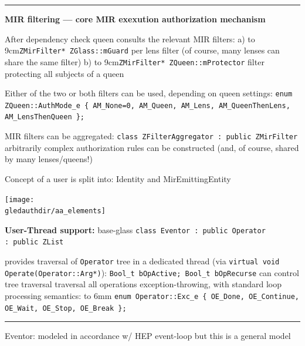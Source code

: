 \documentclass[12pt]{article}
\def\nl{\newline}
\def\bl{\bigskip\hrule\bigskip}
\def\hs6{\hbox to 6mm{}}
\def\qq{\quad\quad}
\def\gledauthdir{../../papers/gled-auth}
\begin{document}
\bl

\textbf{\LARGE MIR filtering --- core MIR exexution authorization mechanism}
\bigskip

After dependency check queen consults the relevant {\color{dblue}MIR
  filters}:\nl
  a) \hbox to 9cm{\texttt{\large\color{dblue}ZMirFilter* ZGlass::mGuard}}%
    per lens filter (of course, many lenses can share the same filter)\nl
  b) \hbox to 9cm{\texttt{\large\color{dblue}ZMirFilter* ZQueen::mProtector}}%
  filter protecting all subjects of a queen

Either of the two or both filters can be used, depending on queen settings:\nl
{\large\verb!enum ZQueen::AuthMode_e { AM_None=0, AM_Queen, AM_Lens, AM_QueenThenLens, AM_LensThenQueen };!}

MIR filters can be aggregated: %
{\large\color{dblue}\verb!class ZFilterAggregator : public ZMirFilter!}\nl
  arbitrarily complex authorization rules can be constructed \hfill%
  {\large\color{dred}(and, of course, shared by many lenses/queens!)}

Concept of a user is split into: Identity and MirEmittingEntity

\newpage

\centerline{\texttt{[image: \\gledauthdir/aa\_elements]}}

\newpage

\textbf{\LARGE User-Thread support:} base-glass
\texttt{\color{dblue}class Eventor :\ public Operator :\ public ZList}

provides traversal of \texttt{\color{dblue}Operator} tree in a dedicated thread
(via \texttt{\large\color{dblue}virtual void Operate(Operator::Arg*)}):\nl
\texttt{\large\color{dblue}Bool\_t bOpActive; Bool\_t bOpRecurse} \qq
can control tree traversal traversal\nl
all operations exception-throwing, with standard loop processing semantics:\nl
\hs6 {\large\color{dblue}\verb!enum Operator::Exc_e { OE_Done, OE_Continue, OE_Wait, OE_Stop, OE_Break };!}

\bl

{\LARGE Eventor: } modeled in accordance w/ HEP event-loop \qq but
this is a general model
\end{document}
